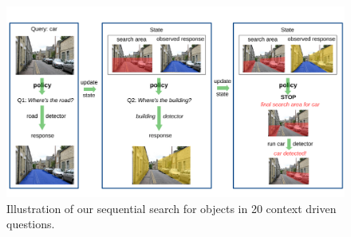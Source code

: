 \begin{figure}[htb]
\begin{center}
\includegraphics[width=\linewidth]{figures/iccv20q-overview.pdf}
\caption{Illustration of our sequential search for objects in 20 context driven questions.}
\label{fig:20Qintro}
\end{center}
\end{figure}





